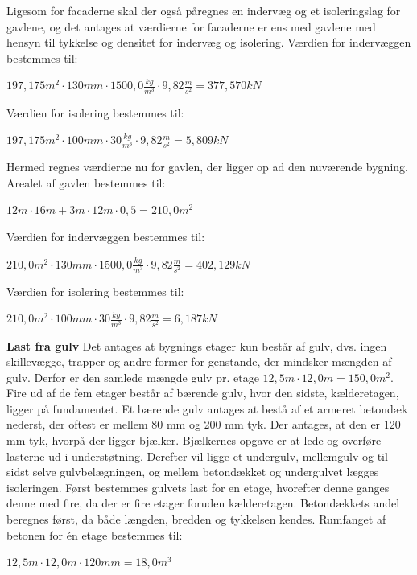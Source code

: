 Ligesom for facaderne skal der også påregnes en indervæg og et isoleringslag for gavlene, og det antages at værdierne for facaderne er ens med gavlene med hensyn til tykkelse og densitet for indervæg og isolering.
\newline
\newline
Værdien for indervæggen bestemmes til:
\begin{center}
	$197,\!175 m^2\cdot 130 mm\cdot 1500,\!0 \frac{kg}{m^3}\cdot 9,\!82 \frac{m}{s^2}=377,\!570 kN$
\end{center}

Værdien for isolering bestemmes til:
\begin{center}
	$197,\!175 m^2\cdot 100 mm\cdot 30 \frac{kg}{m^3}\cdot 9,\!82 \frac{m}{s^2}=5,\!809 kN$
\end{center}

Hermed regnes værdierne nu for gavlen, der ligger op ad den nuværende bygning. 
\newline \indent{     }  Arealet af gavlen bestemmes til:
\begin{center}
	$12 m\cdot 16 m + 3 m\cdot 12 m \cdot 0,\!5=210,\!0 m^2$
\end{center}

Værdien for indervæggen bestemmes til:
\begin{center}
	$210,\!0 m^2\cdot 130 mm\cdot 1500,\!0 \frac{kg}{m^3}\cdot 9,\!82 \frac{m}{s^2}=402,\!129 kN$
\end{center}

Værdien for isolering bestemmes til:
\begin{center}
	$210,\!0 m^2\cdot 100 mm\cdot 30 \frac{kg}{m^3}\cdot 9,\!82 \frac{m}{s^2}=6,\!187 kN$
\end{center}

\textbf{Last fra gulv}
\newline
Det antages at bygnings etager kun består af gulv, dvs. ingen skillevægge, trapper og andre former for genstande, der mindsker mængden af gulv. Derfor er den samlede mængde gulv pr. etage $12,\!5 m\cdot 12,\!0 m=150,\!0 m^2$.
\newline \indent{     }  Fire ud af de fem etager består af bærende gulv, hvor den sidste, kælderetagen, ligger på fundamentet. Et bærende gulv antages at bestå af et armeret betondæk nederst, der oftest er mellem 80 mm og 200 mm tyk. Der antages, at den er 120 mm tyk, hvorpå der ligger bjælker. Bjælkernes opgave er at lede og overføre lasterne ud i understøtning. Derefter vil ligge et undergulv, mellemgulv og til sidst selve gulvbelægningen, og mellem betondækket og undergulvet lægges isoleringen. 
\newline \indent{     }  Først bestemmes gulvets last for en etage, hvorefter denne ganges denne med fire, da der er fire etager foruden kælderetagen. Betondækkets andel beregnes først, da både længden, bredden og tykkelsen kendes. 
\newline
\newline
Rumfanget af betonen for én etage bestemmes til:
\begin{center}
	$12,\!5 m\cdot 12,\!0 m\cdot 120 mm=18,\!0 m^3$
\end{center}

